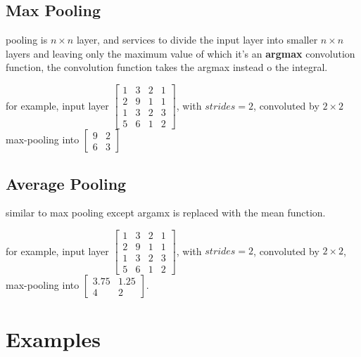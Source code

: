 \documentclass[4apaper,12pt]{book}
\begin{document}
\begin{description}
\begin{description}
      \subsection{Max Pooling}
      \begin{description}
      \item pooling is $n\times{n}$ layer, and services to divide the input layer into smaller $n\times{n}$ layers and leaving only the maximum value of which it's an \textbf{argmax} convolution function, the convolution function takes the argmax instead o the integral.
      \item for example, input layer $\begin{bmatrix}1&3&2&1\\2&9&1&1\\1&3&2&3\\5&6&1&2\end{bmatrix}$, with $strides=2$, convoluted by $2\times{2}$ max-pooling into $\begin{bmatrix}9&2\\6&3\end{bmatrix}$
      \end{description}

      \subsection{Average Pooling}
      \begin{description}
      \item similar to max pooling except argamx is replaced with the mean function.
      \item for example, input layer $\begin{bmatrix}1&3&2&1\\2&9&1&1\\1&3&2&3\\5&6&1&2\end{bmatrix}$, with $strides=2$, convoluted by $2\times{2}$, max-pooling into $\begin{bmatrix}3.75&1.25\\4&2\end{bmatrix}$.
      \end{description}
    \end{description}
    \section{Examples}


\end{description}
\end{document}
